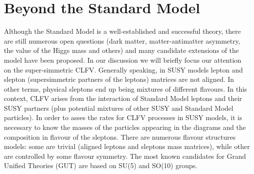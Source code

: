 \documentclass[12pt,a4paper,openright, oneside, titlepage]{book} %
\begin{document}
\section{Beyond the Standard Model}
Although the Standard Model is a well-established and successful theory, 
there are still numerous open questions 
(dark matter, matter-antimatter asymmetry, 
the value of the Higgs mass and others) 
and many candidate extensions of the model have been proposed.
In our discussion we will briefly focus our attention on the super-simmetric CLFV.
Generally speaking, in SUSY models lepton and slepton 
(supersimmetric partners of the leptons) matrices are not aligned. 
In other terms, physical sleptons end up being mixtures of different flavours. 
In this context, CLFV arises from the interaction of Standard Model leptons 
and their SUSY partners 
(plus potential mixtures of other SUSY and Standard Model particles). 
In order to asses the rates for CLFV processes in SUSY models, 
it is necessary to know the masses of the particles appearing in the diagrams and the composition in flavour of the sleptons.
There are numerous flavour structures models: some are trivial (aligned leptons and sleptons mass matrices), 
while other are controlled by some flavour symmetry. 
The most known candidates for Grand Unified Theories (GUT) are based on SU(5) and SO(10) groups.
\end{document}
